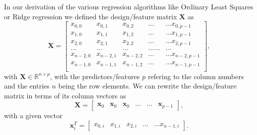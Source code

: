 \documentclass[%
oneside,                 %
final,                   %
10pt]{article}
\begin{document}
In our derivation of the various regression algorithms like Ordinary Least Squares or Ridge regression we defined the design/feature matrix $\bm{X}$ as
\[
\bm{X}=\begin{bmatrix}
x_{0,0} & x_{0,1} & x_{0,2}& \dots & \dots x_{0,p-1}\\
x_{1,0} & x_{1,1} & x_{1,2}& \dots & \dots x_{1,p-1}\\
x_{2,0} & x_{2,1} & x_{2,2}& \dots & \dots x_{2,p-1}\\
\dots & \dots & \dots & \dots \dots & \dots \\
x_{n-2,0} & x_{n-2,1} & x_{n-2,2}& \dots & \dots x_{n-2,p-1}\\
x_{n-1,0} & x_{n-1,1} & x_{n-1,2}& \dots & \dots x_{n-1,p-1}\\
\end{bmatrix},
\]
with $\bm{X}\in {\mathbb{R}}^{n\times p}$, with the predictors/features $p$  refering to the column numbers and the
entries $n$ being the row elements.
We can rewrite the design/feature matrix in terms of its column vectors as
\[
\bm{X}=\begin{bmatrix} \bm{x}_0 & \bm{x}_0 & \bm{x}_0 & \dots & \dots & \bm{x}_{p-1}\end{bmatrix},
\]
with a given vector
\[
\bm{x}_i^T = \begin{bmatrix}x_{0,i} & x_{1,i} & x_{2,i}& \dots & \dots x_{n-1,i}\end{bmatrix}.
\]
\end{document}
